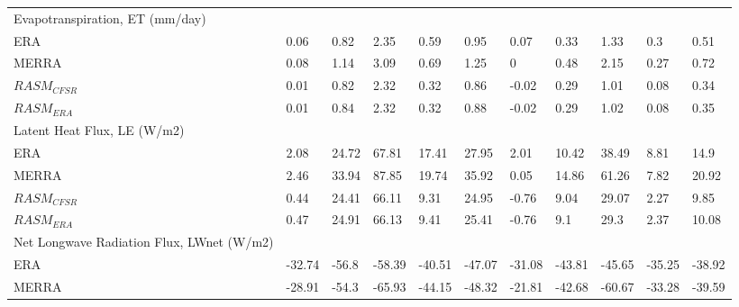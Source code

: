 \begin{table}
{\begin{tabular}{lllllllllll}
Evapotranspiration, ET (mm/day)                &                              &        &        &        &        &        &        &        &        &        \\
ERA                                            & 0.06                         & 0.82   & 2.35   & 0.59   & 0.95   & 0.07   & 0.33   & 1.33   & 0.3    & 0.51   \\
MERRA                                          & 0.08                         & 1.14   & 3.09   & 0.69   & 1.25   & 0      & 0.48   & 2.15   & 0.27   & 0.72   \\
$RASM_{CFSR}$                                       & 0.01                         & 0.82   & 2.32   & 0.32   & 0.86   & -0.02  & 0.29   & 1.01   & 0.08   & 0.34   \\
$RASM_{ERA}$                                        & 0.01                         & 0.84   & 2.32   & 0.32   & 0.88   & -0.02  & 0.29   & 1.02   & 0.08   & 0.35   \\
Latent Heat Flux, LE (W/m2)                    &                              &        &        &        &        &        &        &        &        &        \\
ERA                                            & 2.08                         & 24.72  & 67.81  & 17.41  & 27.95  & 2.01   & 10.42  & 38.49  & 8.81   & 14.9   \\
MERRA                                          & 2.46                         & 33.94  & 87.85  & 19.74  & 35.92  & 0.05   & 14.86  & 61.26  & 7.82   & 20.92  \\
$RASM_{CFSR}$                                       & 0.44                         & 24.41  & 66.11  & 9.31   & 24.95  & -0.76  & 9.04   & 29.07  & 2.27   & 9.85   \\
$RASM_{ERA}$                                        & 0.47                         & 24.91  & 66.13  & 9.41   & 25.41  & -0.76  & 9.1    & 29.3   & 2.37   & 10.08  \\
Net Longwave Radiation Flux, LWnet (W/m2)      &                              &        &        &        &        &        &        &        &        &        \\
ERA                                            & -32.74                       & -56.8  & -58.39 & -40.51 & -47.07 & -31.08 & -43.81 & -45.65 & -35.25 & -38.92 \\
MERRA                                          & -28.91                       & -54.3  & -65.93 & -44.15 & -48.32 & -21.81 & -42.68 & -60.67 & -33.28 & -39.59 \\

\end{tabular}}
\end{table}
